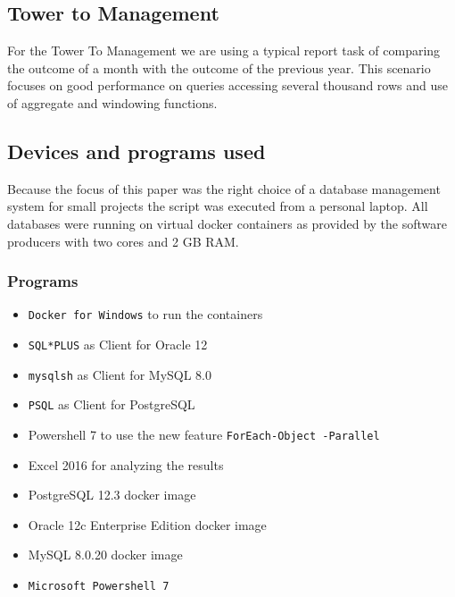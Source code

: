 \documentclass[runningheads]{llncs}
\begin{document}
\subsection{Tower to Management}
For the Tower To Management we are using a typical report task of comparing the outcome of a month with the outcome of the previous year. This scenario focuses on good performance on queries accessing several thousand rows and use of aggregate and windowing functions. 

\subsection{Devices and programs used}
Because the focus of this paper was the right choice of a database management system for small projects the script was executed from a personal laptop. All databases were running on virtual docker containers as provided by the software producers with two cores and 2 GB RAM. 

\subsubsection{Programs}
\begin{itemize}
    \item \verb+Docker for Windows+ to run the containers
    \item \verb+SQL*PLUS+ as Client for Oracle 12 
    \item \verb+mysqlsh+ as Client for MySQL 8.0
    \item \verb+PSQL+ as Client for PostgreSQL 
    \item Powershell 7 to use the new feature \verb+ForEach-Object -Parallel+
    \item Excel 2016 for analyzing the results
    \item PostgreSQL 12.3 docker image
    \item Oracle 12c Enterprise Edition docker image
    \item MySQL 8.0.20 docker image
    \item \verb+Microsoft Powershell 7+ 
\end{itemize}
\end{document}
